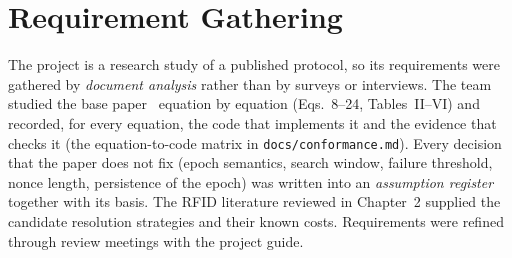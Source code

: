 \section{Requirement Gathering}
The project is a research study of a published protocol, so its requirements were gathered by \emph{document analysis} rather than by surveys or interviews. The team studied the base paper~\cite{base} equation by equation (Eqs.~8--24, Tables~II--VI) and recorded, for every equation, the code that implements it and the evidence that checks it (the equation-to-code matrix in \texttt{docs/conformance.md}). Every decision that the paper does not fix (epoch semantics, search window, failure threshold, nonce length, persistence of the epoch) was written into an \emph{assumption register} together with its basis. The RFID literature reviewed in Chapter~2 supplied the candidate resolution strategies and their known costs. Requirements were refined through review meetings with the project guide.

